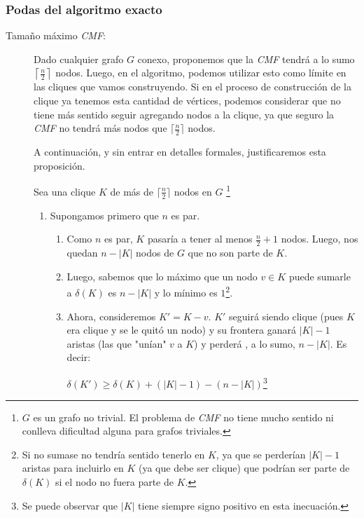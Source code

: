 \subsubsection{Podas del algoritmo exacto}
\begin{description}
    \item[Tama\~no m\'aximo \emph{CMF}: ] Dado cualquier grafo $G$ conexo, proponemos
        que la \emph{CMF} tendr\'a a lo sumo $\left\lceil\frac{n}{2}\right\rceil$ nodos.
        Luego, en el algoritmo, podemos utilizar esto como l\'imite en las cliques que
        vamos construyendo. Si en el proceso de construcci\'on de la clique ya tenemos
        esta cantidad de v\'ertices, podemos considerar que no tiene m\'as sentido
        seguir agregando nodos a la clique, ya que seguro la \emph{CMF} no tendr\'a
        m\'as nodos que $\lceil\frac{n}{2}\rceil$ nodos.

        \par A continuaci\'on, y sin entrar en detalles formales, justificaremos
            esta proposici\'on.

        \par Sea una clique $K$ de m\'as de $\lceil\frac{n}{2}\rceil$ nodos en $G$%
            \footnote{$G$ es un grafo no trivial. El problema de \emph{CMF} no tiene
            mucho sentido ni conlleva dificultad alguna para grafos triviales.}

        \begin{enumerate}
            \item Supongamos primero que $n$ es par.
                \begin{enumerate}
                    \item Como $n$ es par, $K$ pasar\'ia a tener al menos $\frac{n}{2} + 1$
                        nodos. Luego, nos quedan $n - |K|$ nodos de $G$ que no son parte de $K$.
                        \label{tam_min_k_par}

                    \item Luego, sabemos que lo m\'aximo que un nodo $v \in K$  puede
                        sumarle a $\delta(K)$ es $n - |K|$ y lo m\'inimo es $1$\footnote{%
                        Si no sumase no tendr\'ia sentido tenerlo en $K$, ya que
                        se perder\'ian $|K|-1$ aristas para incluirlo en $K$ (ya que
                        debe ser clique) que podr\'ian ser parte de $\delta(K)$ si el
                        nodo no fuera parte de $K$.}.

                    \item Ahora, consideremos $K' = K-v$. $K'$ seguir\'a siendo clique
                        (pues $K$ era clique y se le quit\'o un nodo) y su frontera
                        ganar\'a $|K|-1$ aristas (las que "un\'ian" $v$ a $K$) y perder\'a
                        , a lo sumo, $n - |K|$. Es decir:
                        \par\bigskip
                        $\delta(K') \geq \delta(K) + (|K| - 1) - (n - |K|)$\footnote{%
                        Se puede observar que $|K|$ tiene siempre signo positivo en esta
                        inecuaci\'on.}
                        \bigskip


\end{enumerate}
\end{enumerate}
\end{description}
